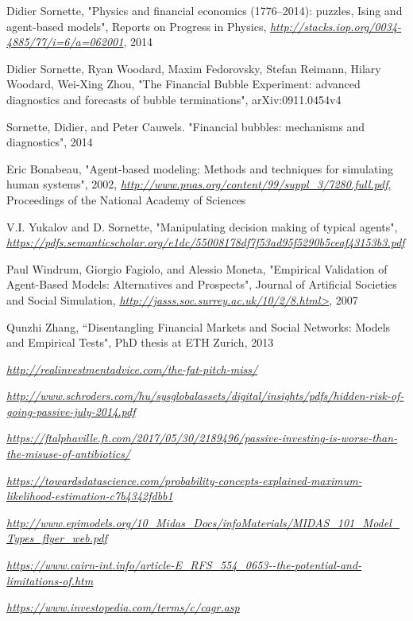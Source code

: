 
\begin{thebibliography}{99}

Didier Sornette, "Physics and financial economics (1776–2014): puzzles, Ising and agent-based models", Reports on Progress in Physics, \textit{\url{http://stacks.iop.org/0034-4885/77/i=6/a=062001}}, 2014

Didier Sornette, Ryan Woodard, Maxim Fedorovsky, Stefan Reimann, Hilary Woodard, Wei-Xing Zhou, "The Financial Bubble Experiment: advanced diagnostics and forecasts of bubble terminations",  arXiv:0911.0454v4 

Sornette, Didier, and Peter Cauwels. "Financial bubbles: mechanisms and diagnostics", 2014


Eric Bonabeau, "Agent-based modeling: Methods and techniques for simulating human systems", 2002, \textit{\url{http://www.pnas.org/content/99/suppl_3/7280.full.pdf}}, Proceedings of the National Academy of Sciences

V.I. Yukalov and D. Sornette, "Manipulating decision making of typical agents", \textit{\url{https://pdfs.semanticscholar.org/e1dc/55008178df7f53ad95f5290b5ceaf43153b3.pdf}}

Paul Windrum, Giorgio Fagiolo, and Alessio Moneta, "Empirical Validation of Agent-Based Models: Alternatives and Prospects", Journal of Artificial Societies and Social Simulation, \textit{\url{http://jasss.soc.surrey.ac.uk/10/2/8.html>}}, 2007

Qunzhi Zhang, ``Disentangling Financial Markets and Social Networks: Models and Empirical Tests", PhD thesis at ETH Zurich, 2013

\textit{\url{http://realinvestmentadvice.com/the-fat-pitch-miss/}}


\textit{\url{http://www.schroders.com/hu/sysglobalassets/digital/insights/pdfs/hidden-risk-of-going-passive-july-2014.pdf}}


\textit{\url{https://ftalphaville.ft.com/2017/05/30/2189496/passive-investing-is-worse-than-the-misuse-of-antibiotics/}}

\textit{\url{https://towardsdatascience.com/probability-concepts-explained-maximum-likelihood-estimation-c7b4342fdbb1}}


\textit{\url{http://www.epimodels.org/10_Midas_Docs/infoMaterials/MIDAS_101_Model_Types_flyer_web.pdf}}

\textit{\url{https://www.cairn-int.info/article-E_RFS_554_0653--the-potential-and-limitations-of.htm}}


\textit{\url{https://www.investopedia.com/terms/c/cagr.asp}}

\end{thebibliography}
